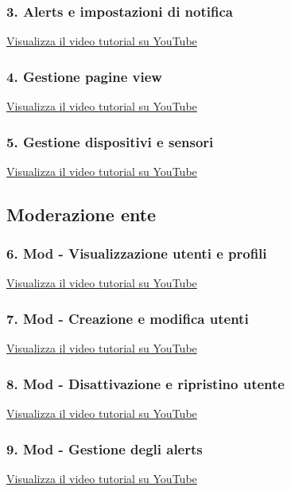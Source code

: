 \subsubsection{3. Alerts e impostazioni di notifica}
\href{https://www.youtube.com/watch?v=PjySMOLCtMA&list=PLPKYjnuIh1FA3b3jn_bwY_ztYzaFn2mIT&index=6}
{Visualizza il video tutorial su YouTube}

\subsubsection{4. Gestione pagine view}
\href{https://www.youtube.com/watch?v=PjySMOLCtMA&list=PLPKYjnuIh1FA3b3jn_bwY_ztYzaFn2mIT&index=7}
{Visualizza il video tutorial su YouTube}

\subsubsection{5. Gestione dispositivi e sensori}
\href{https://www.youtube.com/watch?v=PjySMOLCtMA&list=PLPKYjnuIh1FA3b3jn_bwY_ztYzaFn2mIT&index=8}
{Visualizza il video tutorial su YouTube}

\subsection{Moderazione ente}

\subsubsection{6. Mod - Visualizzazione utenti e profili}
\href{https://www.youtube.com/watch?v=PjySMOLCtMA&list=PLPKYjnuIh1FA3b3jn_bwY_ztYzaFn2mIT&index=9}
{Visualizza il video tutorial su YouTube}

\subsubsection{7. Mod - Creazione e modifica utenti}
\href{https://www.youtube.com/watch?v=PjySMOLCtMA&list=PLPKYjnuIh1FA3b3jn_bwY_ztYzaFn2mIT&index=10}
{Visualizza il video tutorial su YouTube}

\subsubsection{8. Mod - Disattivazione e ripristino utente}
\href{https://www.youtube.com/watch?v=PjySMOLCtMA&list=PLPKYjnuIh1FA3b3jn_bwY_ztYzaFn2mIT&index=11}
{Visualizza il video tutorial su YouTube}

\subsubsection{9. Mod - Gestione degli alerts}
\href{https://www.youtube.com/watch?v=PjySMOLCtMA&list=PLPKYjnuIh1FA3b3jn_bwY_ztYzaFn2mIT&index=12}
{Visualizza il video tutorial su YouTube}


